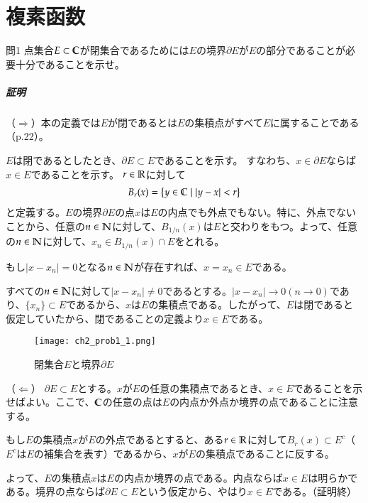 \chapter{複素函数}%

\begin{mysimplebox}{問1}
    点集合$E\subset\mathbb{C}$が閉集合であるためには$E$の境界$\partial E$が$E$の部分であることが必要十分であることを示せ。 
\end{mysimplebox}
\paragraph{証明}
（$\Rightarrow$）本の定義では$E$が閉であるとは$E$の集積点がすべて$E$に属することである（p.22）。

$E$は閉であるとしたとき、$\partial E\subset E$であることを示す。
すなわち、$x\in\partial E$ならば$x\in E$であることを示す。
$r\in\mathbb{R}$に対して
\begin{align*}
    B_r(x)=\left\{y\in\mathbb{C}\mid|y-x|<r\right\}
\end{align*}
と定義する。$E$の境界$\partial E$の点$x$は$E$の内点でも外点でもない。特に、外点でないことから、任意の$n\in \mathbb{N}$に対して、$B_{1/n}(x)$は$E$と交わりをもつ。よって、任意の$n\in \mathbb{N}$に対して、$x_n\in B_{1/n}(x)\cap E$をとれる。

もし$|x-x_n|=0$となる$n\in\mathbb{N}$が存在すれば、$x=x_n\in E$である。

すべての$n\in\mathbb{N}$に対して$|x-x_n|\neq 0$であるとする。$|x-x_n|\longrightarrow 0 (n\longrightarrow 0)$であり、$\{x_n\}\subset E$であるから、$x$は$E$の集積点である。したがって、$E$は閉であると仮定していたから、閉であることの定義より$x\in E$である。

\begin{figure}
    \centering
    \texttt{[image: ch2\_prob1\_1.png]}
    \caption{閉集合$E$と境界$\partial E$}
    \label{ch2_prob1_1}
\end{figure}%

（$\Leftarrow$）
$\partial E\subset E$とする。$x$が$E$の任意の集積点であるとき、$x\in E$であることを示せばよい。ここで、$\mathbb{C}$の任意の点は$E$の内点か外点か境界の点であることに注意する。

もし$E$の集積点$x$が$E$の外点であるとすると、ある$r\in\mathbb{R}$に対して$B_r(x)\subset E^c$（$E^c$は$E$の補集合を表す）であるから、$x$が$E$の集積点であることに反する。

よって、$E$の集積点$x$は$E$の内点か境界の点である。内点ならば$x\in E$は明らかである。境界の点ならば$\partial E\subset E$という仮定から、やはり$x\in E$である。（証明終）

